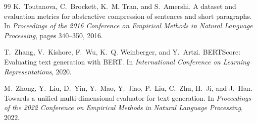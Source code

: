 \documentclass{article}
\begin{document}
\begin{thebibliography}{99}
K.~Toutanova, C.~Brockett, K.~M. Tran, and S.~Amershi.
\newblock A dataset and evaluation metrics for abstractive compression of sentences and short paragraphs.
\newblock In \emph{Proceedings of the 2016 Conference on Empirical Methods in Natural Language Processing}, pages 340--350, 2016.

T.~Zhang, V.~Kishore, F.~Wu, K.~Q. Weinberger, and Y.~Artzi.
\newblock BERTScore: Evaluating text generation with BERT.
\newblock In \emph{International Conference on Learning Representations}, 2020.

M.~Zhong, Y.~Liu, D.~Yin, Y.~Mao, Y.~Jiao, P.~Liu, C.~Zhu, H.~Ji, and J.~Han.
\newblock Towards a unified multi-dimensional evaluator for text generation.
\newblock In \emph{Proceedings of the 2022 Conference on Empirical Methods in Natural Language Processing}, 2022.

\end{thebibliography}
\end{document}

